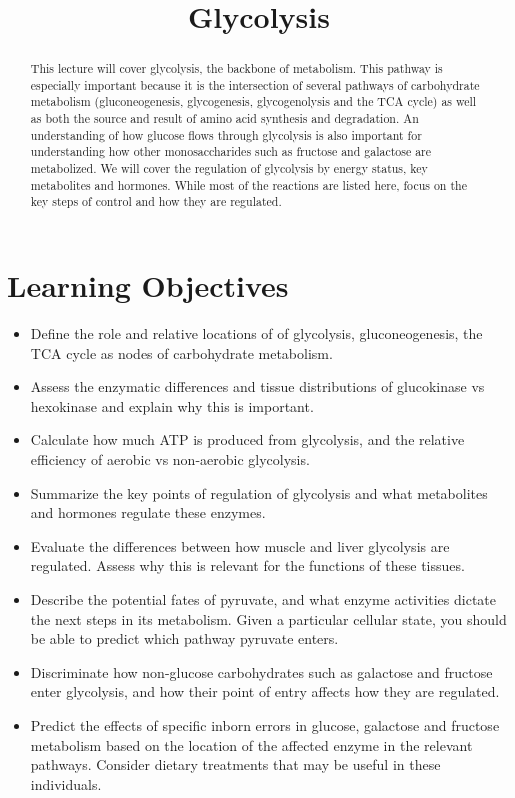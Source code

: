 \documentclass{tufte-handout}
\title{Glycolysis}
\author{}
\date{}  %
\begin{document}
\maketitle%

\begin{abstract}
\noindent This lecture will cover glycolysis, the backbone of metabolism.  This pathway is especially important because it is the intersection of several pathways of carbohydrate metabolism (gluconeogenesis, glycogenesis, glycogenolysis and the TCA cycle) as well as both the source and result of amino acid synthesis and degradation.  An understanding of how glucose flows through glycolysis is also important for understanding how other monosaccharides such as fructose and galactose are metabolized.  We will cover the regulation of glycolysis by energy status, key metabolites and hormones.  While most of the reactions are listed here, focus on the key steps of control and how they are regulated.  
\end{abstract}

\tableofcontents
\pagebreak
\section{Learning Objectives}

\begin{itemize}
\item Define the role and relative locations of of glycolysis, gluconeogenesis, the TCA cycle as nodes of carbohydrate metabolism.
\item Assess the enzymatic differences and tissue distributions of glucokinase vs hexokinase and explain why this is important.
\item Calculate how much ATP is produced from glycolysis, and the relative efficiency of aerobic vs non-aerobic glycolysis.
\item Summarize the key points of regulation of glycolysis and what metabolites and hormones regulate these enzymes.
\item Evaluate the differences between how muscle and liver glycolysis are regulated.  Assess why this is relevant for the functions of these tissues.
\item Describe the potential fates of pyruvate, and what enzyme activities dictate the next steps in its metabolism.  Given a particular cellular state, you should be able to predict which pathway pyruvate enters.
\item Discriminate how non-glucose carbohydrates such as galactose and fructose enter glycolysis, and how their point of entry affects how they are regulated.
\item Predict the effects of specific inborn errors in glucose, galactose and fructose metabolism based on the location of the affected  enzyme in the relevant pathways.  Consider dietary treatments that may be useful in these individuals.

\end{itemize}
\end{document}
